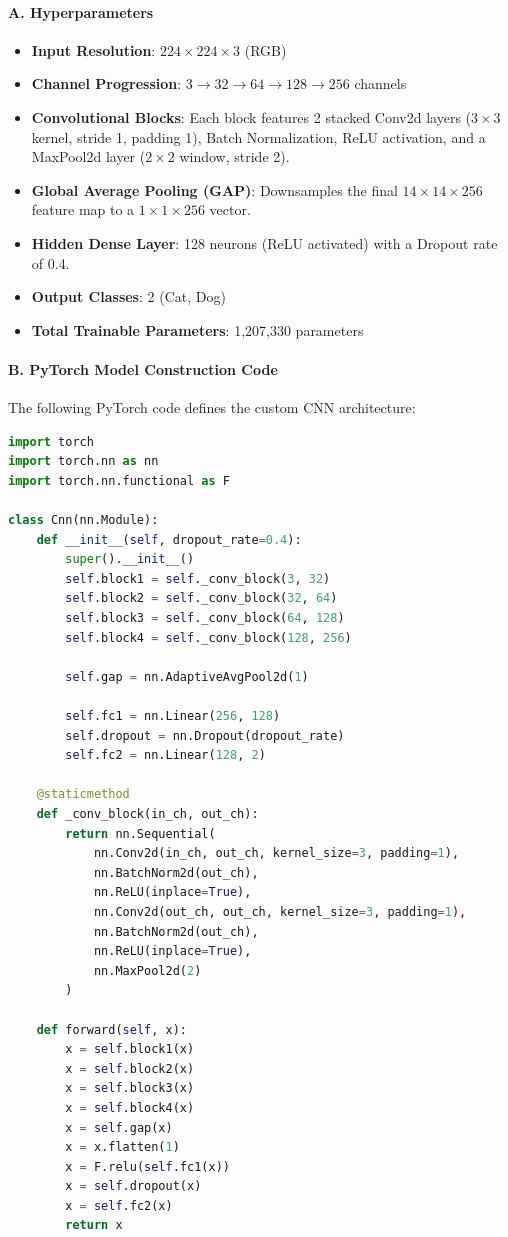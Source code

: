 \documentclass[12pt,a4paper]{article}
\begin{document}
\paragraph{A. Hyperparameters}
\begin{itemize}
    \item \textbf{Input Resolution}: $224 \times 224 \times 3$ (RGB)
    \item \textbf{Channel Progression}: $3 \rightarrow 32 \rightarrow 64 \rightarrow 128 \rightarrow 256$ channels
    \item \textbf{Convolutional Blocks}: Each block features 2 stacked Conv2d layers ($3 \times 3$ kernel, stride 1, padding 1), Batch Normalization, ReLU activation, and a MaxPool2d layer ($2 \times 2$ window, stride 2).
    \item \textbf{Global Average Pooling (GAP)}: Downsamples the final $14 \times 14 \times 256$ feature map to a $1 \times 1 \times 256$ vector.
    \item \textbf{Hidden Dense Layer}: 128 neurons (ReLU activated) with a Dropout rate of 0.4.
    \item \textbf{Output Classes}: 2 (Cat, Dog)
    \item \textbf{Total Trainable Parameters}: 1,207,330 parameters
\end{itemize}

\paragraph{B. PyTorch Model Construction Code}
The following PyTorch code defines the custom CNN architecture:

\begin{lstlisting}[language=Python]
import torch
import torch.nn as nn
import torch.nn.functional as F

class Cnn(nn.Module):
    def __init__(self, dropout_rate=0.4):
        super().__init__()
        self.block1 = self._conv_block(3, 32)
        self.block2 = self._conv_block(32, 64)
        self.block3 = self._conv_block(64, 128)
        self.block4 = self._conv_block(128, 256)

        self.gap = nn.AdaptiveAvgPool2d(1)

        self.fc1 = nn.Linear(256, 128)
        self.dropout = nn.Dropout(dropout_rate)
        self.fc2 = nn.Linear(128, 2)

    @staticmethod
    def _conv_block(in_ch, out_ch):
        return nn.Sequential(
            nn.Conv2d(in_ch, out_ch, kernel_size=3, padding=1),
            nn.BatchNorm2d(out_ch),
            nn.ReLU(inplace=True),
            nn.Conv2d(out_ch, out_ch, kernel_size=3, padding=1),
            nn.BatchNorm2d(out_ch),
            nn.ReLU(inplace=True),
            nn.MaxPool2d(2)
        )

    def forward(self, x):
        x = self.block1(x)
        x = self.block2(x)
        x = self.block3(x)
        x = self.block4(x)
        x = self.gap(x)
        x = x.flatten(1)
        x = F.relu(self.fc1(x))
        x = self.dropout(x)
        x = self.fc2(x)
        return x
\end{lstlisting}
\end{document}

